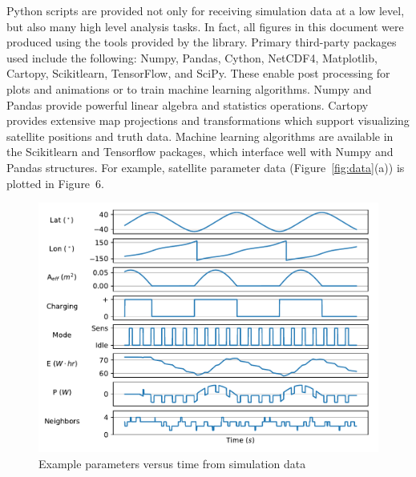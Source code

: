 \documentclass[conference]{IEEEtran}
\begin{document}
Python scripts are provided not only for receiving simulation data at a low level, but also many high level analysis tasks.  In fact, all figures in this document were produced using the tools provided by the library.  Primary third-party packages used include the following: Numpy, Pandas, Cython, NetCDF4, Matplotlib, Cartopy, Scikitlearn, TensorFlow, and SciPy.  These enable post processing for plots and animations or to train machine learning algorithms.  Numpy and Pandas provide powerful linear algebra and statistics operations.  Cartopy provides extensive map projections and transformations which support visualizing satellite positions and truth data.  Machine learning algorithms are available in the Scikitlearn and Tensorflow packages, which interface well with Numpy and Pandas structures.
%
For example, satellite parameter data (Figure~\ref{fig:data}(a)) is plotted in Figure~6. %

\begin{figure}[t]
  \begin{center}
    \includegraphics[width=0.9\linewidth]{images/param_plot.pdf}
  \caption{Example parameters versus time from simulation data}
  \end{center}
  \label{fig:processing}
\end{figure}

\end{document}
